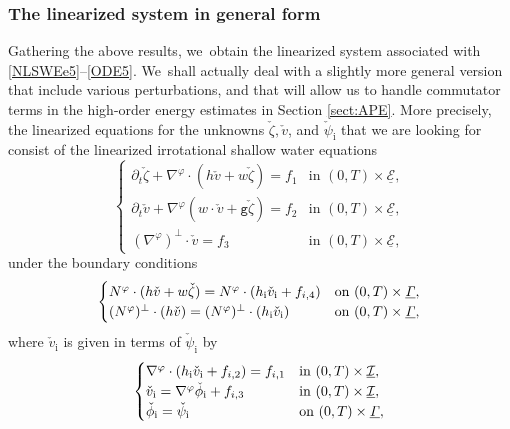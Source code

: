 \documentclass[11pt]{article}
\newcommand{\gr}{{\mathtt g}}
\newcommand{\dt}{\partial_t}
\newcommand{\cI}{{\mathcal I}}
\newcommand{\cE}{{\mathcal E}}
\newcommand{\ul}[1]{\underline{#1}}
\newcommand{\itGamma}{\mathit{\Gamma}}
\theoremstyle{definition}
\begin{document}
\subsubsection{The linearized system in general form}
Gathering the above results, we~obtain the linearized system associated with \eqref{NLSWEe5}--\eqref{ODE5}. We~shall actually deal with a slightly more general version that include various perturbations,
and that will allow us to handle commutator terms in the high-order energy estimates in Section \ref{sect:APE}.
More precisely, the linearized equations for the unknowns $\check{\zeta},\check{v}$, and $\check{\psi}_\mathrm{i}$
that we are looking for consist of the linearized irrotational shallow water equations
\begin{equation}\label{LSWEe2}
\begin{cases}
\dt\check{\zeta}+\nabla^\varphi\cdot(h\check{v}+w\check{\zeta}) = f_1 &\text{in } (0,T)\times\ul{\cE}, \\
\dt\check{v}+\nabla^\varphi(w\cdot\check{v}+\gr\check{\zeta}) = f_2 &\text{in } (0,T)\times\ul{\cE}, \\
(\nabla^\varphi)^\perp\cdot\check{v} = f_3 &\text{in } (0,T)\times\ul{\cE},
\end{cases}
\end{equation}
under the boundary conditions
\begin{equation}\label{LBC4}
\begin{cases}
N^\varphi\cdot(h\check{v}+w\check{\zeta}) = N^\varphi\cdot(h_\mathrm{i}\check{v}_\mathrm{i}+f_{{\rm i},4}) &\text{on } (0,T)\times\ul{\itGamma}, \\
(N^\varphi)^\perp\cdot(h\check{v})=(N^\varphi)^\perp\cdot(h_\mathrm{i}\check{v}_\mathrm{i}) &\text{on } (0,T)\times\ul{\itGamma},
\end{cases}
\end{equation}
where $\check{v}_\mathrm{i}$ is given in terms of $\check{\psi}_\mathrm{i}$ by
\begin{equation}\label{LSWEi2}
\begin{cases}
\nabla^\varphi\cdot(h_\mathrm{i}\check{v}_\mathrm{i}+f_{{\rm i},2})=f_{{\rm i},1} &\text{in } (0,T)\times\ul{\cI}, \\
\check{v}_\mathrm{i}=\nabla^\varphi\check{\phi}_\mathrm{i} + f_{{\rm i},3} &\text{in } (0,T)\times\ul{\cI}, \\
\check{\phi}_\mathrm{i}=\check{\psi}_\mathrm{i} &\text{on } (0,T)\times\ul{\itGamma},
\end{cases}
\end{equation}
\end{document}
